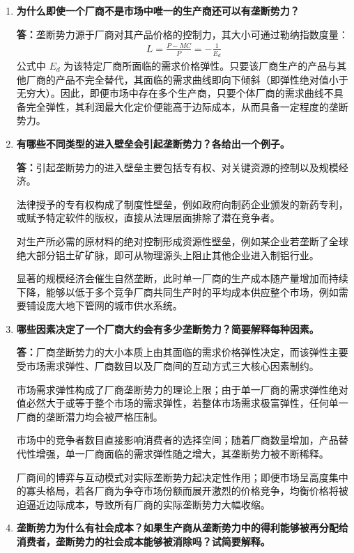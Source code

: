 \begin{enumerate}[label=\textbf{\arabic*.}, leftmargin=*]
		\item \textbf{为什么即使一个厂商不是市场中唯一的生产商还可以有垄断势力？}
		
		\textbf{答：}垄断势力源于厂商对其产品价格的控制力，其大小可通过勒纳指数度量：
		\[
		\begin{aligned}
			L = \frac{P - MC}{P} = -\frac{1}{E_d}
		\end{aligned}
		\]
		公式中 $E_d$ 为该特定厂商所面临的需求价格弹性。只要该厂商生产的产品与其他厂商的产品不完全替代，其面临的需求曲线即向下倾斜（即弹性绝对值小于无穷大）。因此，即便市场中存在多个生产商，只要个体厂商的需求曲线不具备完全弹性，其利润最大化定价便能高于边际成本，从而具备一定程度的垄断势力。
		
		\item \textbf{有哪些不同类型的进入壁垒会引起垄断势力？各给出一个例子。}
		
		\textbf{答：}引起垄断势力的进入壁垒主要包括专有权、对关键资源的控制以及规模经济。
		
		法律授予的专有权构成了制度性壁垒，例如政府向制药企业颁发的新药专利，或赋予特定软件的版权，直接从法理层面排除了潜在竞争者。
		
		对生产所必需的原材料的绝对控制形成资源性壁垒，例如某企业若垄断了全球绝大部分铝土矿矿脉，即可从物理源头上阻止其他企业进入制铝行业。
		
		显著的规模经济会催生自然垄断，此时单一厂商的生产成本随产量增加而持续下降，能够以低于多个竞争厂商共同生产时的平均成本供应整个市场，例如需要铺设庞大地下管网的城市供水系统。
		
		\item \textbf{哪些因素决定了一个厂商大约会有多少垄断势力？简要解释每种因素。}
		
		\textbf{答：}厂商垄断势力的大小本质上由其面临的需求价格弹性决定，而该弹性主要受市场需求弹性、厂商数目以及厂商间的互动方式三大核心因素制约。
		
		市场需求弹性构成了厂商垄断势力的理论上限；由于单一厂商的需求弹性绝对值必然大于或等于整个市场的需求弹性，若整体市场需求极富弹性，任何单一厂商的垄断潜力均会被严格压制。
		
		市场中的竞争者数目直接影响消费者的选择空间；随着厂商数量增加，产品替代性增强，单一厂商面临的需求弹性随之增大，其垄断势力被不断稀释。
		
		厂商间的博弈与互动模式对实际垄断势力起决定性作用；即便市场呈高度集中的寡头格局，若各厂商为争夺市场份额而展开激烈的价格竞争，均衡价格将被迫逼近边际成本，导致所有厂商的实际垄断势力大幅收缩。
		
		\item \textbf{垄断势力为什么有社会成本？如果生产商从垄断势力中的得利能够被再分配给消费者，垄断势力的社会成本能够被消除吗？试简要解释。}
		

\end{enumerate}
